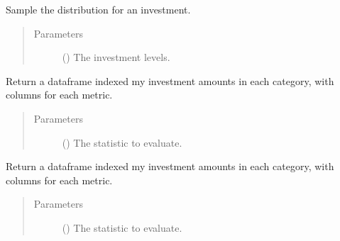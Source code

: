 \documentclass[letterpaper,10pt,english]{sphinxmanual}
\begin{document}
\begin{fulllineitems}

\begin{fulllineitems}
\label{\detokenize{tyche:tyche.Evaluator.Evaluator.evaluate}}
Sample the distribution for an investment.
\begin{quote}\begin{description}
\item[{Parameters}] \leavevmode
{} () \textendash{} The investment levels.

\end{description}\end{quote}

\end{fulllineitems}


\begin{fulllineitems}
\label{\detokenize{tyche:tyche.Evaluator.Evaluator.evaluate_corners_semilong}}
Return a dataframe indexed my investment amounts in each category,
with columns for each metric.
\begin{quote}\begin{description}
\item[{Parameters}] \leavevmode
{} () \textendash{} The statistic to evaluate.

\end{description}\end{quote}

\end{fulllineitems}


\begin{fulllineitems}
\label{\detokenize{tyche:tyche.Evaluator.Evaluator.evaluate_corners_wide}}
Return a dataframe indexed my investment amounts in each category,
with columns for each metric.
\begin{quote}\begin{description}
\item[{Parameters}] \leavevmode
{} () \textendash{} The statistic to evaluate.


\end{description}
\end{quote}
\end{fulllineitems}
\end{fulllineitems}
\end{document}
